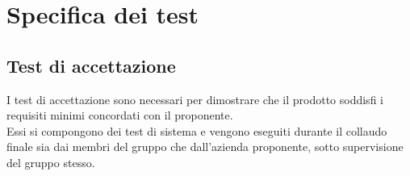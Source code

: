 \section{Specifica dei test}\label{section:specifica_test}

\subsection{Test di accettazione}\label{subsection:test_accettazione}
I test di accettazione sono necessari per dimostrare che il prodotto soddisfi i requisiti minimi concordati con il proponente. \\
Essi si compongono dei test di sistema e vengono eseguiti durante il collaudo finale sia dai membri del 
gruppo che dall'azienda proponente, sotto supervisione del gruppo stesso.

